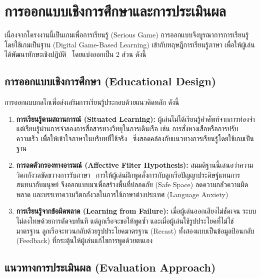 
\section{การออกแบบเชิงการศึกษาและการประเมินผล}

เนื่องจากโครงงานนี้เป็นเกมเพื่อการเรียนรู้ (Serious Game) การออกแบบจึงบูรณาการการเรียนรู้โดยใช้เกมเป็นฐาน (Digital Game-Based Learning) เข้ากับทฤษฎีการเรียนรู้ภาษา เพื่อให้ผู้เล่นได้พัฒนาทักษะเชิงปฏิบัติ~\cite{sadigzade2025} โดยแบ่งออกเป็น 2 ส่วน ดังนี้

\subsection{การออกแบบเชิงการศึกษา (Educational Design)}

การออกแบบกลไกเพื่อส่งเสริมการเรียนรู้ประกอบด้วยแนวคิดหลัก ดังนี้

\begin{enumerate}[label=\arabic*)]
    \item \textbf{การเรียนรู้ตามสถานการณ์ (Situated Learning):} ผู้เล่นไม่ได้เรียนรู้คำศัพท์จากการท่องจำ แต่เรียนรู้ผ่านการจำลองการสื่อสารทางวิทยุในการเดินเรือ เช่น การสั่งหางเสือหรือการปรับความเร็ว เพื่อให้เข้าใจภาษาในบริบทที่ใช้จริง~\cite{lave1991} ซึ่งสอดคล้องกับแนวทางการเรียนรู้โดยใช้เกมเป็นฐาน~\cite{sadigzade2025}
    \item \textbf{การลดตัวกรองทางอารมณ์ (Affective Filter Hypothesis):} สมมติฐานนี้เสนอว่าความวิตกกังวลขัดขวางการรับภาษา~\cite{krashen1982} การให้ผู้เล่นฝึกพูดสั่งการกับลูกเรือปัญญาประดิษฐ์แทนการสนทนากับมนุษย์ จึงออกแบบมาเพื่อสร้างพื้นที่ปลอดภัย (Safe Space) ลดความกลัวความผิดพลาด และบรรเทาความวิตกกังวลในการใช้ภาษาต่างประเทศ (Language Anxiety)
    \item \textbf{การเรียนรู้จากข้อผิดพลาด (Learning from Failure):} เมื่อผู้เล่นออกเสียงไม่ชัดเจน ระบบไม่ลงโทษด้วยการตัดจบทันที แต่ลูกเรือจะขอให้พูดซ้ำ และเมื่อผู้เล่นใช้รูปประโยคที่ไม่ใช่มาตรฐาน ลูกเรือจะทวนกลับด้วยรูปประโยคมาตรฐาน (Recast) ทั้งสองแบบเป็นข้อมูลป้อนกลับ (Feedback) ที่กระตุ้นให้ผู้เล่นแก้ไขการพูดด้วยตนเอง~\cite{zargham2024}
\end{enumerate}

\subsection{แนวทางการประเมินผล (Evaluation Approach)}

